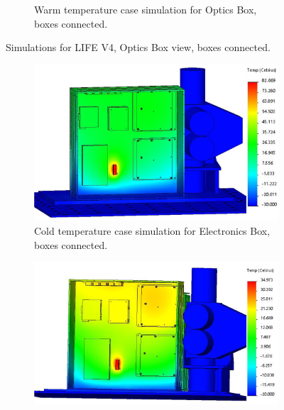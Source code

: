 \begin{figure}
\begin{subfigure}[h]{0.6\textwidth}
        \caption{Warm temperature case simulation for Optics Box, boxes connected.}
        \label{fig:LIFE_V4_TA_Optics_1c}
    \end{subfigure}
    \caption{Simulations for LIFE V4, Optics Box view, boxes connected.}
    \label{LIFE_V4_TA_1_Optics}
\end{figure}

\begin{figure}
    \centering
    \begin{subfigure}[h]{0.58\textwidth}
        \centering
        \includegraphics[width=\textwidth]{chap3_images/LIFE_V4_images/TA_Full_Model_Iter_1_ebox_FIXED.png}
        \caption{Cold temperature case simulation for Electronics Box, boxes connected.}
        \label{fig:LIFE_V4_TA_Ebox_1a}
    \end{subfigure}
    \begin{subfigure}[h]{0.58\textwidth}
        \centering
        \includegraphics[width=\textwidth]{chap3_images/LIFE_V4_images/TA_Full_Model_Iter_2_ebox_FIXED.png}

\end{subfigure}
\end{figure}

